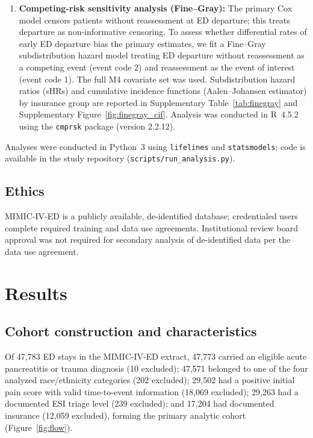 \documentclass[11pt]{article}
\newcommand{\CohortN}{17,204}
\newcommand{\FlowAllED}{47,783}
\begin{document}
\begin{enumerate}
  \item \textbf{Competing-risk sensitivity analysis (Fine--Gray):} The primary Cox model censors patients without reassessment at ED departure; this treats departure as non-informative censoring. To assess whether differential rates of early ED departure bias the primary estimates, we fit a Fine--Gray subdistribution hazard model \citep{Fine1999} treating ED departure without reassessment as a competing event (event code 2) and reassessment as the event of interest (event code 1). The full M4 covariate set was used. Subdistribution hazard ratios (sHRs) and cumulative incidence functions (Aalen--Johansen estimator) by insurance group are reported in Supplementary Table~\ref{tab:finegray} and Supplementary Figure~\ref{fig:finegray_cif}. Analysis was conducted in R~4.5.2 using the \texttt{cmprsk} package (version 2.2.12).
\end{enumerate}

Analyses were conducted in Python~3 using \texttt{lifelines} and \texttt{statsmodels}; code is available in the study repository (\texttt{scripts/run\_analysis.py}).

\subsection{Ethics}

MIMIC-IV-ED is a publicly available, de-identified database; credentialed users complete required training and data use agreements.
Institutional review board approval was not required for secondary analysis of de-identified data per the data use agreement.


\section{Results}
\label{sec:results}

\subsection{Cohort construction and characteristics}

Of \FlowAllED{} ED stays in the MIMIC-IV-ED extract, 47,773 carried an eligible acute pancreatitis or trauma diagnosis (10 excluded); 47,571 belonged to one of the four analyzed race/ethnicity categories (202 excluded); 29,502 had a positive initial pain score with valid time-to-event information (18,069 excluded); 29,263 had a documented ESI triage level (239 excluded); and \CohortN{} had documented insurance (12,059 excluded), forming the primary analytic cohort (Figure~\ref{fig:flow}).
\end{document}
